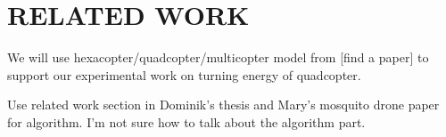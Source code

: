 \section{RELATED WORK}

We will use hexacopter/quadcopter/multicopter model from [find a paper] to support our experimental work on turning energy of quadcopter.

Use related work section in Dominik's thesis and Mary's mosquito drone paper for algorithm.
I'm not sure how to talk about the algorithm part.
